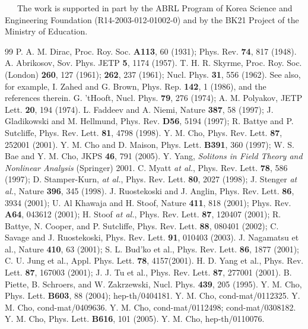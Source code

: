 \documentclass[twocolumn,showpacs,showkeys]{revtex4}
\begin{document}
~~~The work is supported in part by the ABRL Program of
Korea Science and Engineering Foundation (R14-2003-012-01002-0)
and by the BK21 Project of the Ministry of Education.

\begin{thebibliography}{99}
P. A. M. Dirac, Proc. Roy. Soc. {\bf A113}, 60 (1931);
Phys. Rev. {\bf 74}, 817 (1948).
 A. Abrikosov, Sov. Phys. JETP {\bf 5}, 1174 (1957).
T. H. R. Skyrme, Proc. Roy. Soc. (London) {\bf 260}, 127
(1961); {\bf 262}, 237 (1961); Nucl. Phys. {\bf 31}, 556 (1962).
See also, for example, I. Zahed and G. Brown,
Phys. Rep. {\bf 142}, 1 (1986), and the references therein.
G. 'tHooft, Nucl. Phys. {\bf 79}, 276 (1974);
A. M. Polyakov, JETP Lett. {\bf 20}, 194 (1974).  
 L. Faddeev and A. Niemi, Nature {\bf 387}, 58 (1997);
J. Gladikowski and M. Hellmund, Phys. Rev. {\bf D56}, 5194 (1997);
R. Battye and P. Sutcliffe, Phys. Rev. Lett. {\bf 81}, 4798
(1998).
 Y. M. Cho, Phys. Rev. Lett. {\bf 87}, 252001 (2001).
 Y. M. Cho and D. Maison, Phys. Lett. {\bf B391},
360 (1997); W. S. Bae and Y. M. Cho, JKPS {\bf 46}, 791 (2005).
 Y. Yang, {\it Solitons in Field Theory and Nonlinear
Analysis} (Springer) 2001.
 C. Myatt {\it at al.}, Phys. Rev. Lett. {\bf 78}, 586 (1997); 
D. Stamper-Kurn, {\it at al.}, Phys. Rev. Lett. {\bf 80}, 2027 (1998);
J. Stenger {\it at al.}, Nature {\bf 396}, 345 (1998).
 J. Ruostekoski and J. Anglin, Phys. Rev. Lett.
{\bf 86}, 3934 (2001); U. Al Khawaja and H. Stoof, Nature {\bf 411},
818 (2001); Phys. Rev. {\bf A64}, 043612 (2001); 
H. Stoof {\it at al.}, Phys. Rev. Lett. {\bf 87}, 120407 (2001); 
R. Battye, N. Cooper, and P. Sutcliffe, Phys. Rev. Lett. {\bf 88}, 
080401 (2002); C. Savage and J. Ruostekoski, Phys. Rev. Lett. {\bf 91}, 
010403 (2003).
J. Nagamatsu et al., Nature {\bf 410}, 63 (2001);
S. L. Bud'ko et al., Phys. Rev. Lett. {\bf 86}, 1877 (2001);
C. U. Jung et al., Appl. Phys. Lett. {\bf 78}, 4157(2001).
H. D. Yang et al., Phys. Rev. Lett. {\bf 87}, 167003 (2001);
J. J. Tu et al., Phys. Rev. Lett. {\bf 87}, 277001 (2001).
 B. Piette, B. Schroers, and W. Zakrzewski,
Nucl. Phys. {\bf 439}, 205 (1995).
 Y. M. Cho, Phys. Lett. {\bf B603}, 88 (2004);
hep-th/0404181.
 Y. M. Cho, cond-mat/0112325.
 Y. M. Cho, cond-mat/0409636.
 Y. M. Cho, cond-mat/0112498; cond-mat/0308182.
Y. M. Cho, Phys. Lett. {\bf B616}, 101 (2005).
 Y. M. Cho, hep-th/0110076.
\end{thebibliography}
\end{document}
